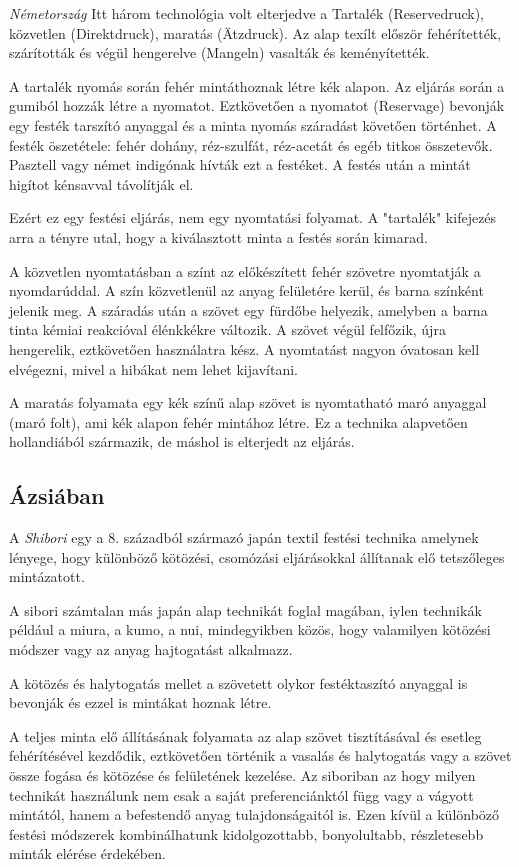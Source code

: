 \documentclass[fontsize=12pt, appendixprefix=true]{scrreprt}
\begin{document}
\textit{Németország} 
Itt három technológia volt elterjedve a Tartalék (Reservedruck), közvetlen (Direktdruck), maratás (Ätzdruck). Az alap texílt először fehérítették, szárították és végül hengerelve (Mangeln) vasalták és keményítették.

A tartalék nyomás során fehér mintáthoznak létre kék alapon. Az eljárás során a gumiból hozzák létre a nyomatot. Eztkövetően a nyomatot (Reservage) bevonják egy festék tarszító anyaggal és a minta nyomás száradást követően történhet. A festék öszetétele: fehér dohány, réz-szulfát, réz-acetát és egéb titkos összetevők. Pasztell vagy német indigónak hívták ezt a festéket. A festés után a mintát higítot kénsavval távolítják el.

Ezért ez egy festési eljárás, nem egy nyomtatási folyamat. A "tartalék" kifejezés arra a tényre utal, hogy a kiválasztott minta a festés során kimarad.

A közvetlen nyomtatásban a színt az előkészített fehér szövetre nyomtatják a nyomdarúddal. A szín közvetlenül az anyag felületére kerül, és barna színként jelenik meg. A száradás után a szövet egy fürdőbe helyezik, amelyben a barna tinta kémiai reakcióval élénkkékre változik. A szövet végül felfőzik, újra hengerelik, eztkövetően használatra kész. A nyomtatást nagyon óvatosan kell elvégezni, mivel a hibákat nem lehet kijavítani.

A maratás folyamata egy kék színű alap szövet is nyomtatható maró anyaggal (maró folt), ami kék alapon fehér mintához létre. Ez a technika alapvetően hollandiából származik, de máshol is elterjedt az eljárás.


\subsection{Ázsiában}
A \textit{Shibori} egy a 8. századból származó japán textil festési technika amelynek lényege, hogy különböző kötözési, csomózási eljárásokkal állítanak elő tetszőleges mintázatott.

A sibori számtalan más japán alap technikát foglal magában, iylen technikák például a miura, a kumo, a nui, mindegyikben közös, hogy valamilyen kötözési módszer vagy az anyag hajtogatást alkalmazz. 

A kötözés és halytogatás mellet a szövetett olykor festéktaszító anyaggal is bevonják és ezzel is mintákat hoznak létre.

A teljes minta elő állításának folyamata az alap szövet tisztításával és esetleg fehérítésével kezdődik, eztkövetően történik a vasalás és halytogatás vagy a szövet össze fogása és kötözése és felületének kezelése.
Az siboriban az hogy milyen technikát használunk nem csak a saját preferenciánktól függ vagy a vágyott mintától, hanem a befestendő anyag tulajdonságaitól is. Ezen kívül  a különböző festési módszerek kombinálhatunk kidolgozottabb, bonyolultabb, részletesebb minták elérése érdekében. 
\end{document}
